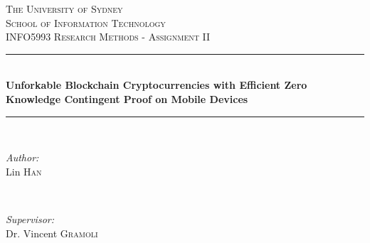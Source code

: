 \documentclass[12pt]{article}
\begin{document}
\begin{titlepage}

\newcommand{\HRule}{\rule{\linewidth}{0.5mm}} %

\center %
 

\textsc{\LARGE The University of Sydney}\\[1.5cm] %
\textsc{\Large School of Information Technology}\\[0.5cm] %
\textsc{\large INFO5993 Research Methods - Assignment II}\\[0.5cm] %


\HRule \\[0.6cm]
{ \huge \bfseries Unforkable Blockchain Cryptocurrencies with Efficient Zero Knowledge Contingent Proof on Mobile Devices}\\[0.4cm] %
\HRule \\[1.6cm]
 

\begin{minipage}{0.4\textwidth}
\begin{flushleft} \large
\emph{Author:}\\
Lin \textsc{Han} %
\end{flushleft}
\end{minipage}
~
\begin{minipage}{0.4\textwidth}
\begin{flushright} \large
\emph{Supervisor:} \\
Dr. Vincent \textsc{Gramoli} %
\end{flushright}
\end{minipage}\\[2cm]


\end{titlepage}
\end{document}
